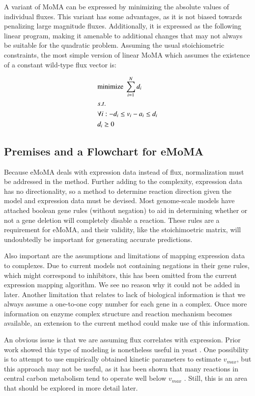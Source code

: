 \documentclass[phd,tocprelim]{cornell}
\begin{document}
A variant of MoMA can be expressed by minimizing the absolute values of individual fluxes.
This variant has some advantages, as it is not biased towards penalizing large magnitude fluxes. Additionally,
it is expressed as the following linear program, making it amenable to additional changes that
may not always be suitable for the quadratic problem. Assuming the usual stoichiometric constraints,
the most simple version of linear MoMA which assumes the existence of a constant wild-type flux vector is:

\begin{align*}
&\textnormal{minimize}\ \sum^N_{i=1}d_i  \\
&s.t.\\
&\forall i: -d_i \le v_i-a_i \le d_i \\
&d_i \ge 0
\end{align*}

\subsection{Premises and a Flowchart for eMoMA}
Because eMoMA deals with expression data instead of flux, normalization must be addressed in the method.
Further adding to the complexity, expression data has no directionality, so a method to determine 
reaction direction given the model and expression data must be devised. Most genome-scale models have
attached boolean gene rules (without negation) to aid in determining whether or not a gene deletion will
completely disable a reaction. These rules are a requirement for eMoMA, and their validity, like the
stoichimoetric matrix, will undoubtedly be important for generating accurate predictions.

Also important are the assumptions and limitations of mapping expression data to complexes. Due to 
current models not containing negations in their gene rules, which might correspond to inhibitors,
this has been omitted from the current expression mapping algorithm. We see no reason why it could not
be added in later. Another limitation that relates to lack of biological information is that we always
assume a one-to-one copy number for each gene in a complex. Once more information on enzyme complex
structure and reaction mechanism becomes available, an extension to the current method could make use
of this information.

An obvious issue is that we are assuming flux correlates with expression. Prior
work showed this type of modeling is nonetheless useful in yeast \cite{Lee2012}. One possibility
is to attempt to use empirically obtained kinetic parameters to estimate $v_{max}$, but this
approach may not be useful, as it has been shown that many reactions in central carbon
metabolism tend to operate well below $v_{max}$ \cite{Bennett2010}. Still, this is an area that should
be explored in more detail later.
\end{document}
